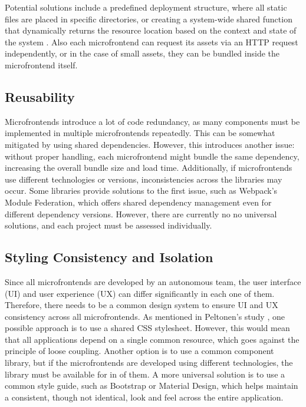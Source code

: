 \noindent
Potential solutions include a predefined deployment structure, where all static files are placed in specific directories, or creating a system-wide shared function that dynamically returns the resource location based on the context and state of the system \cite{Pavlenko}. Also each microfrontend can request its assets via an HTTP request independently, or in the case of small assets, they can be bundled inside the microfrontend itself.

\subsection{Reusability}
Microfrontends introduce a lot of code redundancy, as many components must be implemented in multiple microfrontends repeatedly. This can be somewhat mitigated by using shared dependencies. However, this introduces another issue: without proper handling, each microfrontend might bundle the same dependency, increasing the overall bundle size and load time. Additionally, if microfrontends use different technologies or versions, inconsistencies across the libraries may occur. Some libraries provide solutions to the first issue, such as Webpack's Module Federation, which offers shared dependency management even for different dependency versions. However, there are currently no no universal solutions, and each project must be assessed individually.

\subsection{Styling Consistency and Isolation}
Since all microfrontends are developed by an autonomous team, the user interface (UI) and user experience (UX) can differ significantly in each one of them. Therefore, there needs to be a common design system to ensure UI and UX consistency across all microfrontends. As mentioned in Peltonen's study \cite{Peltonen}, one possible approach is to use a shared CSS stylesheet. However, this would mean that all applications depend on a single common resource, which goes against the principle of loose coupling. Another option is to use a common component library, but if the microfrontends are developed using different technologies, the library must be available for in of them. A more universal solution is to use a common style guide, such as Bootstrap or Material Design, which helps maintain a consistent, though not identical, look and feel across the entire application. \\

